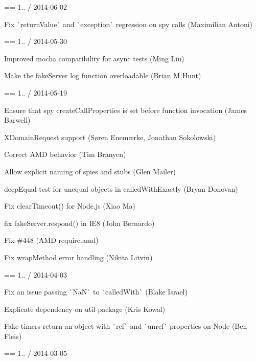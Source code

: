 == 1.. / 2014-\/06-\/02


\begin{DoxyItemize}
\item Fix \`{}return\+Value\`{} and \`{}exception\`{} regression on spy calls (Maximilian Antoni)
\end{DoxyItemize}

== 1.. / 2014-\/05-\/30


\begin{DoxyItemize}
\item Improved mocha compatibility for async tests (Ming Liu)
\item Make the fake\+Server log function overloadable (Brian M Hunt)
\end{DoxyItemize}

== 1.. / 2014-\/05-\/19


\begin{DoxyItemize}
\item Ensure that spy create\+Call\+Properties is set before function invocation (James Barwell)
\item X\+Domain\+Request support (Søren Enemærke, Jonathan Sokolowski)
\item Correct A\+MD behavior (Tim Branyen)
\item Allow explicit naming of spies and stubs (Glen Mailer)
\item deep\+Equal test for unequal objects in called\+With\+Exactly (Bryan Donovan)
\item Fix clear\+Timeout() for Node.\+js (Xiao Ma)
\item fix fake\+Server.\+respond() in I\+E8 (John Bernardo)
\item Fix \#448 (A\+MD require.\+amd)
\item Fix wrap\+Method error handling (Nikita Litvin)
\end{DoxyItemize}

== 1.. / 2014-\/04-\/03


\begin{DoxyItemize}
\item Fix an issue passing \`{}\+Na\+N\`{} to \`{}called\+With\`{} (Blake Israel)
\item Explicate dependency on util package (Kris Kowal)
\item Fake timers return an object with \`{}ref\`{} and \`{}unref\`{} properties on Node (Ben Fleis)
\end{DoxyItemize}

== 1.. / 2014-\/03-\/05


